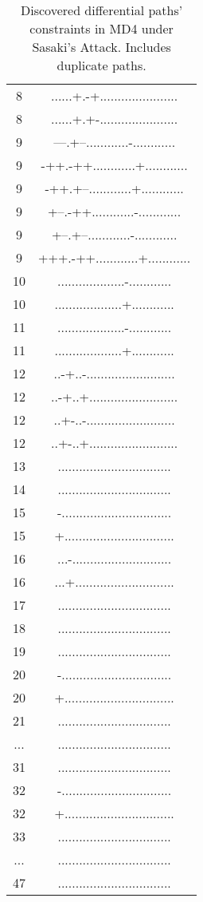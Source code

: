 \documentclass[letterpaper,twocolumn,10pt]{article}
\begin{document}
\begin{table}[H]
\begin{tiny}
{\begin{tabular}{|c c|}
8 & ......+.-+...................... \\
8 & ......+.+-...................... \\
9 & ---.+--............-............ \\
9 & -++.-++............+............ \\
9 & -++.+--............+............ \\
9 & +--.-++............-............ \\
9 & +--.+--............-............ \\
9 & +++.-++............+............ \\
10 & ...................-............ \\
10 & ...................+............ \\
11 & ...................-............ \\
11 & ...................+............ \\
12 & ..-+..-......................... \\
12 & ..-+..+......................... \\
12 & ..+-..-......................... \\
12 & ..+-..+......................... \\
13 & ................................ \\
14 & ................................ \\
15 & -............................... \\
15 & +............................... \\
16 & ...-............................ \\
16 & ...+............................ \\
17 & ................................ \\
18 & ................................ \\
19 & ................................ \\
20 & -............................... \\
20 & +............................... \\
21 & ................................ \\
... & ................................ \\
31 & ................................ \\
32 & -............................... \\
32 & +............................... \\
33 & ................................ \\
... & ................................ \\
47 & ................................ \\
\hline
\end{tabular}
}
\end{tiny}
\caption{Discovered differential paths' constraints in MD4 under Sasaki's Attack.
Includes duplicate paths.}
\label{table:3}
\end{table}
\end{document}
